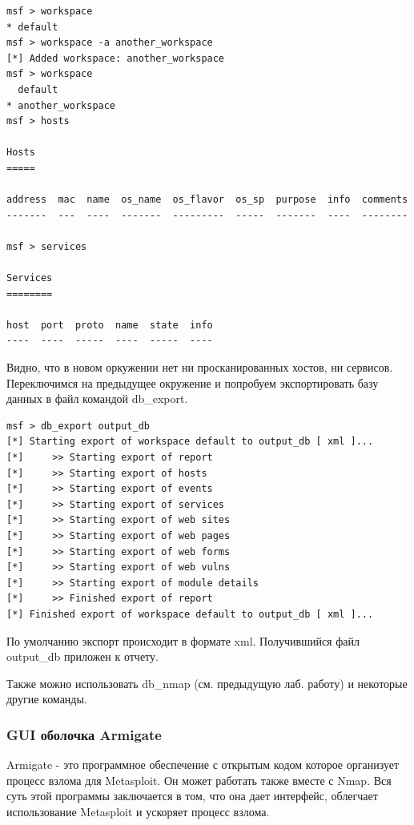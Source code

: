\documentclass[10pt,a4paper,titlepage]{article}
\begin{document}
\begin{verbatim}
msf > workspace
* default
msf > workspace -a another_workspace
[*] Added workspace: another_workspace
msf > workspace
  default
* another_workspace
msf > hosts

Hosts
=====

address  mac  name  os_name  os_flavor  os_sp  purpose  info  comments
-------  ---  ----  -------  ---------  -----  -------  ----  --------

msf > services

Services
========

host  port  proto  name  state  info
----  ----  -----  ----  -----  ----
\end{verbatim}
Видно, что в новом оркужении нет ни просканированных хостов, ни сервисов.\\

Переключимся на предыдущее окружение и попробуем экспортировать базу данных в файл командой db\_export.
\begin{verbatim}
msf > db_export output_db
[*] Starting export of workspace default to output_db [ xml ]...
[*]     >> Starting export of report
[*]     >> Starting export of hosts
[*]     >> Starting export of events
[*]     >> Starting export of services
[*]     >> Starting export of web sites
[*]     >> Starting export of web pages
[*]     >> Starting export of web forms
[*]     >> Starting export of web vulns
[*]     >> Starting export of module details
[*]     >> Finished export of report
[*] Finished export of workspace default to output_db [ xml ]...
\end{verbatim}
По умолчанию экспорт происходит в формате xml. Получившийся файл output\_db приложен к отчету.

Также можно использовать db\_nmap (см. предыдущую лаб. работу) и некоторые другие команды.

\subsubsection{GUI оболочка Armigate}
Armigate - это программное обеспечение с открытым кодом которое организует процесс взлома для Metasploit. Он может работать также вместе с Nmap. Вся суть этой программы заключается в том, что она дает интерфейс, облегчает использование Metasploit и ускоряет процесс взлома.
\end{document}
